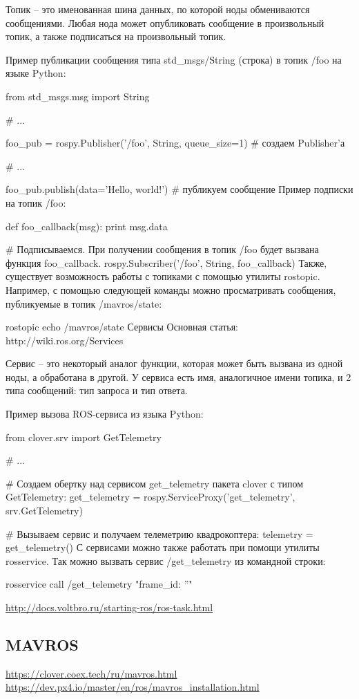 Топик – это именованная шина данных, по которой ноды обмениваются сообщениями. Любая нода может опубликовать сообщение в произвольный топик, а также подписаться на произвольный топик.

Пример публикации сообщения типа std_msgs/String (строка) в топик /foo на языке Python:

from std_msgs.msg import String

# ...

foo_pub = rospy.Publisher('/foo', String, queue_size=1)  # создаем Publisher'а

# ...

foo_pub.publish(data='Hello, world!')  # публикуем сообщение
Пример подписки на топик /foo:

def foo_callback(msg):
print msg.data

# Подписываемся. При получении сообщения в топик /foo будет вызвана функция foo_callback.
rospy.Subscriber('/foo', String, foo_callback)
Также, существует возможность работы с топиками с помощью утилиты rostopic. Например, с помощью следующей команды можно просматривать сообщения, публикуемые в топик /mavros/state:

rostopic echo /mavros/state
Сервисы
Основная статья: http://wiki.ros.org/Services

Сервис – это некоторый аналог функции, которая может быть вызвана из одной ноды, а обработана в другой. У сервиса есть имя, аналогичное имени топика, и 2 типа сообщений: тип запроса и тип ответа.

Пример вызова ROS-сервиса из языка Python:

from clover.srv import GetTelemetry

# ...

# Создаем обертку над сервисом get_telemetry пакета clover с типом GetTelemetry:
get_telemetry = rospy.ServiceProxy('get_telemetry', srv.GetTelemetry)

# Вызываем сервис и получаем телеметрию квадрокоптера:
telemetry = get_telemetry()
С сервисами можно также работать при помощи утилиты rosservice. Так можно вызвать сервис /get_telemetry из командной строки:

rosservice call /get_telemetry "{frame_id: ''}"

\url{http://docs.voltbro.ru/starting-ros/ros-task.html}

\subsection{MAVROS}
\url{https://clover.coex.tech/ru/mavros.html}
\url{https://dev.px4.io/master/en/ros/mavros_installation.html}

